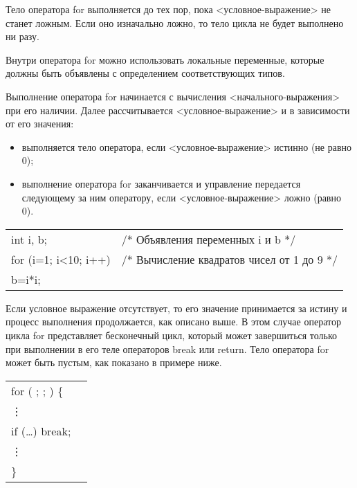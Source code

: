 Тело оператора for выполняется до тех пор, пока <условное-выражение> не станет ложным. Если оно изначально ложно, то тело цикла не будет выполнено ни разу. \killoverfullbefore

Внутри оператора for можно использовать локальные переменные, которые должны быть объявлены с определением соответствующих типов. 

Выполнение оператора for начинается с вычисления <начального-выражения> при его наличии.  Далее рассчитывается <условное-выражение> и в зависимости от его значения:
\begin{itemize}
\item выполняется тело оператора, если <условное-выражение> истинно (не равно 0);
\item выполнение оператора for заканчивается и управление передается следующему за ним оператору, если <условное-выражение> ложно (равно 0). \killoverfullbefore \BL
\end{itemize}

\begin{pExample}
\begin{tabular}{ l l }
int i, b; & \textcolor{exComm}{/* Объявления переменных i и b */} \\
for (i=1; i<10; i++)  & \textcolor{exComm}{/* Вычисление квадратов чисел от 1 до 9 */} \\
\indent b=i*i; & \textcolor{exComm}{ } \\
\end{tabular}
\end{pExample}

Если условное выражение отсутствует, то его значение принимается за истину и процесс выполнения продолжается, как описано выше. В этом случае оператор цикла for представляет бесконечный цикл, который может завершиться только при выполнении в его теле операторов break или return. Тело оператора for может быть пустым, как показано в примере ниже. \killoverfullbefore \BL

\begin{pExample}
\begin{tabular}{ l l }
for ( ; ; ) \{ & \textcolor{exComm}{ } \\
\indent  \vdots & \textcolor{exComm}{ } \\
\indent if (\dots) break; & \textcolor{exComm}{ } \\
\indent  \vdots & \textcolor{exComm}{ } \\
\} & \textcolor{exComm}{ } \\
\end{tabular}
\end{pExample}

